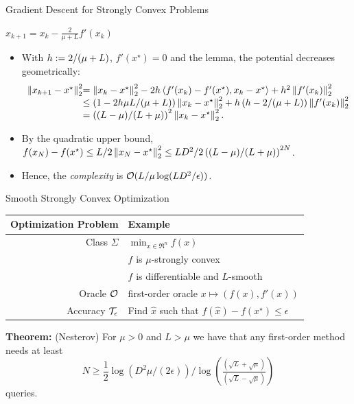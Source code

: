 \documentclass[9pt]{beamer}
\begin{document}
\begin{frame}{Gradient Descent for Strongly Convex Problems}

  \begin{center}
    \begin{tcolorbox}[width=0.4\textwidth]%
      $x_{k+1} = x_k - \frac{2}{\mu+L} f'(x_k)$
    \end{tcolorbox}
  \end{center}

  \begin{itemize}
  \item With $h:={2}/{(\mu+L)}$, $f'(x^\star)=0$ and the lemma, the potential decreases geometrically:
    \[
      \begin{array}{r@{}l}
        \norm{x_{k+1}-x^\star}_2^2 &= \norm{x_k-x^\star}_2^2 - 2h\iprod{f'(x_k)-f'(x^\star)}{x_k-x^\star} + h^2\norm{f'(x_k)}_2^2\\
                                   &\leq \left(1-\tfrac{2h\mu L}{(\mu+L)}\right)\norm{x_k-x^\star}_2^2 + h\left(h-\tfrac{2}{(\mu+L)}\right)\norm{f'(x_k)}_2^2\\
                                   &= \left(\tfrac{(L-\mu)}{(L+\mu)}\right)^2\norm{x_k-x^\star}_2^2.
      \end{array}
    \]
  \item<2-> By the quadratic upper bound, $f(x_N)-f(x^\star)\leq {L}/{2}\left\|x_N-x^\star\right\|_2^2\leq {LD^2}/{2}\left({(L-\mu)}/{(L+\mu)}\right)^{2N}$.
  \item<3-> Hence, the \emph{complexity} is $\mathcal O({L}/{\mu}\log({LD^2}/{\epsilon}))$.
  \end{itemize}

\end{frame}

\begin{frame}{Smooth Strongly Convex Optimization}

  \begin{center}
    \begin{tabular}{r|l}
      \hline
      Optimization Problem & Example \\[0.5em]
      \hline
      Class $\Sigma$ & $\min_{x\in \Re^n} f(x)$ \\[0.5em]
                           & $f$ is $\mu$-strongly convex\\[0.5em]
                           & $f$ is differentiable and $L$-smooth\\[0.5em]
      Oracle $\mathcal O$ & first-order oracle $x\mapsto (f(x), f'(x))$\\[0.5em]
      Accuracy $\mathcal T_\epsilon$ & Find $\hat x$ such that $f(\hat x)-f(x^\star)\leq\epsilon$\\[0.5em]
      \hline
    \end{tabular}
  \end{center}

  \vfill

  \textbf{Theorem:} (Nesterov) For $\mu>0$ and $L>\mu$ we have that any first-order method needs at least
  $$N \geq \frac{1}{2} \log(D^2\mu/(2\epsilon))/\log(\tfrac{(\sqrt{L}+\sqrt{\mu})}{(\sqrt{L}-\sqrt{\mu})})$$
  queries.

\end{frame}
\end{document}
